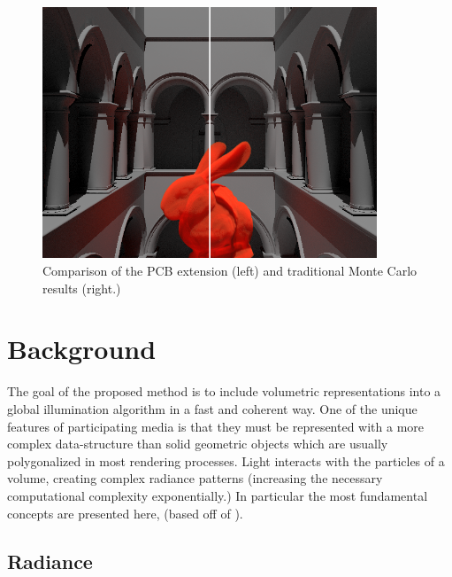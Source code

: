 \documentclass[12pt]{ucthesis}
\begin{document}
\begin{figure}[h!]
    \centering
    \includegraphics[width=100mm]{img/compare.png}
    \caption{Comparison of the PCB extension (left) and traditional Monte Carlo results (right.)}
    \label{fig:compare}
\end{figure}

\chapter{Background}
\label{background}

The goal of the proposed method is to include volumetric representations into a global illumination algorithm in a fast and coherent way. One of the unique features of participating media is that they must be represented with a more complex data-structure than solid geometric objects which are usually polygonalized in most rendering processes.  Light interacts with the particles of a volume, creating complex radiance patterns (increasing the necessary computational complexity exponentially.) In particular the most fundamental concepts are presented here,  (based off of  \cite{pbrt}).

\section{Radiance}
\end{document}
